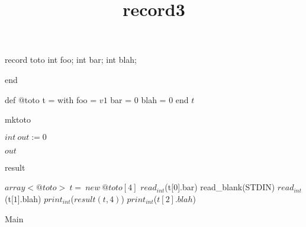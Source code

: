 \documentclass[8pt]{article}
\title{record3}
\begin{document}
\maketitle
record toto int foo;
int bar;
int blah;

end

\begin{algorithm}[H]
def @toto t = with foo = $ v1 $
bar = $ 0 $
blah = $ 0 $ end
\Return $ t $\;
\caption{mktoto}
\end{algorithm}
\begin{algorithm}[H]
$int\:out := 0$\;

\Return $ out $\;
\caption{result}
\end{algorithm}

\begin{algorithm}[H]
$array<@toto>\:t=\:new\:@toto[4]$\;
$read_{int}$(t[$ 0 $].bar)\;
read\_blank(STDIN)\;
$read_{int}$(t[$ 1 $].blah)\;
$print_{int}$($ result(t, 4) $)\;
$print_{int}$($ t[2].blah $)\;
\caption{Main}
\end{algorithm}
\end{document}

